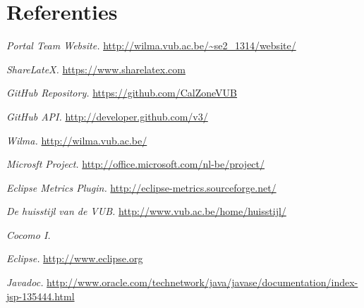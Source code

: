 \chapter{Referenties}
\begingroup
\renewcommand{\chapter}[2]{}%
\begin{thebibliography}{99}

     \emph{Portal Team Website.} \url{http://wilma.vub.ac.be/~se2_1314/website/}
    
     \emph{ShareLateX.} \url{https://www.sharelatex.com}
    
     \emph{GitHub Repository.} \url{https://github.com/CalZoneVUB}
    
     \emph{GitHub API.} \url{http://developer.github.com/v3/}
    
     \emph{Wilma.} \url{http://wilma.vub.ac.be/}
    
     \emph{Microsft Project.} \url{http://office.microsoft.com/nl-be/project/}
    
    
     \emph{Eclipse Metrics Plugin.} \url{http://eclipse-metrics.sourceforge.net/}
    
     \emph{De huisstijl van de VUB.} \url{http://www.vub.ac.be/home/huisstijl/}

	 \emph{Cocomo I.} 

     \emph{Eclipse.} \url{http://www.eclipse.org}
    
     \emph{Javadoc.} \url{http://www.oracle.com/technetwork/java/javase/documentation/index-jsp-135444.html}
\end{thebibliography}

\endgroup